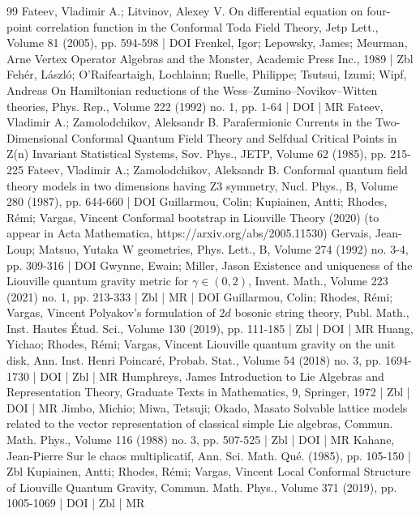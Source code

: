 \begin{thebibliography}{99}
Fateev, Vladimir A.; Litvinov, Alexey V. On differential equation on four-point correlation function in the Conformal Toda Field Theory, Jetp Lett., Volume 81 (2005), pp. 594-598 | DOI
Frenkel, Igor; Lepowsky, James; Meurman, Arne Vertex Operator Algebras and the Monster, Academic Press Inc., 1989 | Zbl
Fehér, László; O’Raifeartaigh, Lochlainn; Ruelle, Philippe; Tsutsui, Izumi; Wipf, Andreas On Hamiltonian reductions of the Wess–Zumino–Novikov–Witten theories, Phys. Rep., Volume 222 (1992) no. 1, pp. 1-64 | DOI | MR
Fateev, Vladimir A.; Zamolodchikov, Aleksandr B. Parafermionic Currents in the Two-Dimensional Conformal Quantum Field Theory and Selfdual Critical Points in Z(n) Invariant Statistical Systems, Sov. Phys., JETP, Volume 62 (1985), pp. 215-225
Fateev, Vladimir A.; Zamolodchikov, Aleksandr B. Conformal quantum field theory models in two dimensions having Z3 symmetry, Nucl. Phys., B, Volume 280 (1987), pp. 644-660 | DOI
Guillarmou, Colin; Kupiainen, Antti; Rhodes, Rémi; Vargas, Vincent Conformal bootstrap in Liouville Theory (2020) (to appear in Acta Mathematica, https://arxiv.org/abs/2005.11530)
Gervais, Jean-Loup; Matsuo, Yutaka W geometries, Phys. Lett., B, Volume 274 (1992) no. 3-4, pp. 309-316 | DOI
Gwynne, Ewain; Miller, Jason Existence and uniqueness of the Liouville quantum gravity metric for $\gamma \in (0,2)$, Invent. Math., Volume 223 (2021) no. 1, pp. 213-333 | Zbl | MR | DOI
Guillarmou, Colin; Rhodes, Rémi; Vargas, Vincent Polyakov’s formulation of $2d$ bosonic string theory, Publ. Math., Inst. Hautes Étud. Sci., Volume 130 (2019), pp. 111-185 | Zbl | DOI | MR
Huang, Yichao; Rhodes, Rémi; Vargas, Vincent Liouville quantum gravity on the unit disk, Ann. Inst. Henri Poincaré, Probab. Stat., Volume 54 (2018) no. 3, pp. 1694-1730 | DOI | Zbl | MR
Humphreys, James Introduction to Lie Algebras and Representation Theory, Graduate Texts in Mathematics, 9, Springer, 1972 | Zbl | DOI | MR
Jimbo, Michio; Miwa, Tetsuji; Okado, Masato Solvable lattice models related to the vector representation of classical simple Lie algebras, Commun. Math. Phys., Volume 116 (1988) no. 3, pp. 507-525 | Zbl | DOI | MR
Kahane, Jean-Pierre Sur le chaos multiplicatif, Ann. Sci. Math. Qué. (1985), pp. 105-150 | Zbl
Kupiainen, Antti; Rhodes, Rémi; Vargas, Vincent Local Conformal Structure of Liouville Quantum Gravity, Commun. Math. Phys., Volume 371 (2019), pp. 1005-1069 | DOI | Zbl | MR

\end{thebibliography}
